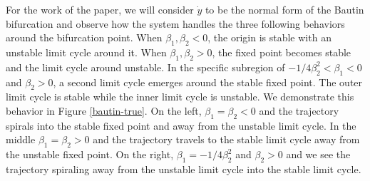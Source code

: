 For the work of the paper, we will consider $\dot{y}$ to be the normal form of the Bautin bifurcation and observe how the system handles the three following behaviors around the bifurcation point. When $\beta_1,\beta_2 < 0$, the origin is stable with an unstable limit cycle around it. When $\beta_1,\beta_2 > 0$, the fixed point becomes stable and the limit cycle around unstable. In the specific subregion of $-1/4 \beta_2^2 < \beta_1 < 0$ and $\beta_2>0$, a second limit cycle emerges around the stable fixed point. The outer limit cycle is stable while the inner limit cycle is unstable. We demonstrate this behavior in Figure \ref{bautin-true}. On the left, $\beta_1 = \beta_2 < 0$ and the trajectory spirals into the stable fixed point and away from the unstable limit cycle. In the middle $\beta_1 = \beta_2 > 0$ and the trajectory travels to the stable limit cycle away from the unstable fixed point. On the right, $\beta_1 = -1/4 \beta_2^2$ and $\beta_2 > 0$ and we see the trajectory spiraling away from the unstable limit cycle into the stable limit cycle. 

